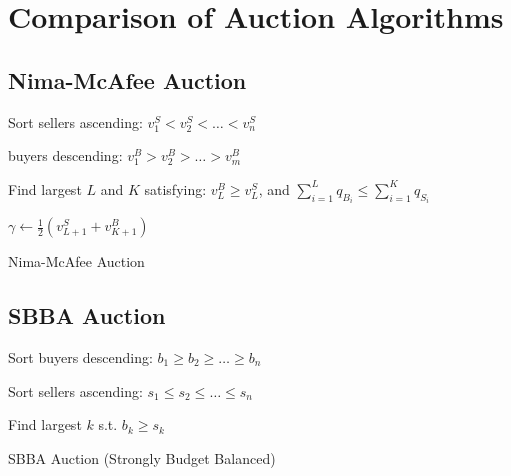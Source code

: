 \documentclass{article}
\begin{document}
\section{Comparison of Auction Algorithms}

\subsection{Nima-McAfee Auction}
\begin{algorithm}[htbp]
\DontPrintSemicolon
Sort sellers ascending: $v^S_{1}<v^S_{2}<\dots<v^S_{n}$

\Sort buyers descending: $v^B_{1}>v^B_{2}>\dots>v^B_{m}$

Find largest $L$ and $K$ satisfying:
$v^B_{L}\ge v^S_{L}$, and $\sum_{i=1}^{L} q_{B_i}\le \sum_{i=1}^{K} q_{S_i}$

\BlankLine
$\gamma \leftarrow \frac{1}{2}(v^S_{L+1}+v^B_{K+1})$

\caption{Nima-McAfee Auction}
\label{alg:nima_mcafee}
\end{algorithm}


\subsection{SBBA Auction}
\begin{algorithm}[htbp]
\DontPrintSemicolon
Sort buyers descending: $b_1 \geq b_2 \geq \dots \geq b_n$

Sort sellers ascending: $s_1 \leq s_2 \leq \dots \leq s_n$

\BlankLine
Find largest $k$ s.t. $b_k \geq s_k$

\caption{SBBA Auction (Strongly Budget Balanced)}
\label{alg:sbba}
\end{algorithm}
\end{document}
